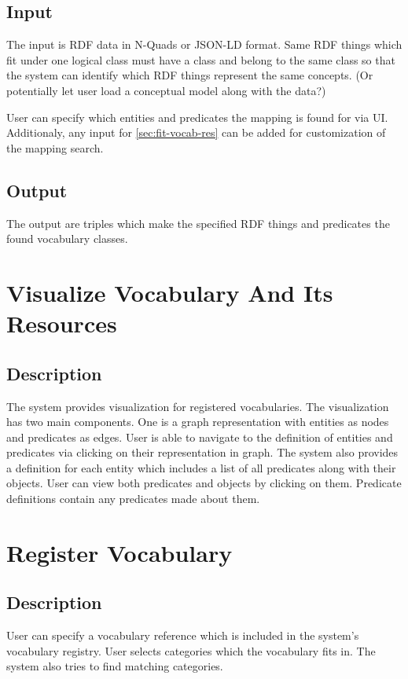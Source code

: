\subsection{Input}
The input is RDF data in N-Quads or JSON-LD format. Same RDF things which fit under one logical class must have a class and belong to the same class so that the system can identify which RDF things represent the same concepts. (Or potentially let user load a conceptual model along with the data?)

User can specify which entities and predicates the mapping is found for via UI. Additionaly, any input for \autoref{sec:fit-vocab-res} can be added for customization of the mapping search.

\subsection{Output}
The output are triples which make the specified RDF things and predicates the found vocabulary classes. 

\section{Visualize Vocabulary And Its Resources}
\subsection{Description}
The system provides visualization for registered vocabularies. The visualization has two main components. One is a graph representation with entities as nodes and predicates as edges. User is able to navigate to the definition of entities and predicates via clicking on their representation in graph. The system also provides a definition for each entity which includes a list of all predicates along with their objects. User can view both predicates and objects by clicking on them. Predicate definitions contain any predicates made about them.

\section{Register Vocabulary}
\subsection{Description}
User can specify a vocabulary reference which is included in the system's vocabulary registry. User selects categories which the vocabulary fits in. The system also tries to find matching categories.

